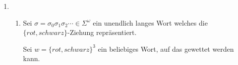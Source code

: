 \documentclass[a4paper]{scrartcl}
\newtheorem*{behaupt}{Behauptung}
\def \blattnr {2}
\begin{document}
\begin{enumerate}[label=\bfseries \blattnr.\arabic*]
\begin{enumerate}[label=\alph*)]
            \item
                \begin{behaupt}
                    Für eine endliche Menge $E$ ist $1$ ein Eigenwert von $P$.
                \end{behaupt}
                \begin{proof}
                    $\lambda$ ist ein Eigenwert von $P$ zum Eigenvektor $x$,
                    wenn gilt
                    \begin{equation*}
                        P \cdot x = \lambda \cdot x
                        \text{ .}
                    \end{equation*}
                    Wir betrachten den Fall $\lambda = 1$. Es muss also einen
                    Spaltenvektor $(x_i)_{i \in E}$ geben, so dass
                    \begin{equation}
                        P \cdot x = x
                        \text{ .}
                        \label{eq:eigenfoo}
                    \end{equation}
                    Wir behaupten, dass der Einsvektor der Länge $|E|$ ein
                    solcher Eigenvektor ist: $x = (1)_{i \in E}$.
                    Sei $x' = P \cdot x$. Dann gilt für alle $i \in E$:
                    \begin{equation*}
                        x'_i = \sum_{j \in E} p_{ij} \cdot x_j
                        = \sum_{j \in E} p_{ij} \cdot 1
                        = \sum_{j \in E} p_{ij}
                        = 1
                        = x_i
                    \end{equation*}
                    Der Einsvektor erfüllt also die Gleichung
                    \eqref{eq:eigenfoo} Damit ist gezeigt, dass $1$ ein
                    Eigenwert von $P$ ist.
                \end{proof}

        \end{enumerate}

    \pagebreak
    \item
        \begin{enumerate}[label=\alph*)]
            \item
		Sei $\sigma = \sigma_0 \sigma_1 \sigma_2 \dotsm \in \Sigma^\omega$ 
		ein unendlich langes Wort welches die \\$\{rot,schwarz\}$-Ziehung repräsentiert.
		
		Sei $w = \{rot,schwarz\}^3$ ein beliebiges Wort, auf das gewettet werden kann.
		

\end{enumerate}
\end{enumerate}
\end{document}
